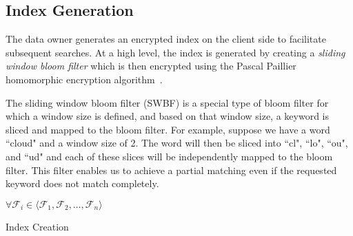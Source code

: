 \subsection{Index Generation}

The data owner generates an encrypted index on the client side to facilitate
subsequent searches. At a high level, the index is generated by creating a 
\textit{sliding window bloom filter} which is then encrypted using the Pascal Paillier
homomorphic encryption algorithm~\cite{pascal}. 

The sliding window bloom filter (SWBF) is a special type of bloom filter
for which a window size is defined, and based on that
window size, a keyword is sliced and mapped to the bloom filter. For example,
suppose we have a word ``cloud" and a window size of 2. The word will then be
sliced into ``cl", ``lo", ``ou", and ``ud" and each of these slices will be 
independently mapped to the bloom filter. This filter enables us to achieve
 a partial matching even if the requested keyword does not match
 completely.

\begin{algorithm}[b!]
$ \forall \mathcal{F}_i \in \langle \mathcal{F}_1, \mathcal{F}_2, \ldots,
\mathcal{F}_n \rangle$\;
\;
 \caption{Index Creation}
 \label{algo:IndexCreation}
\end{algorithm}


